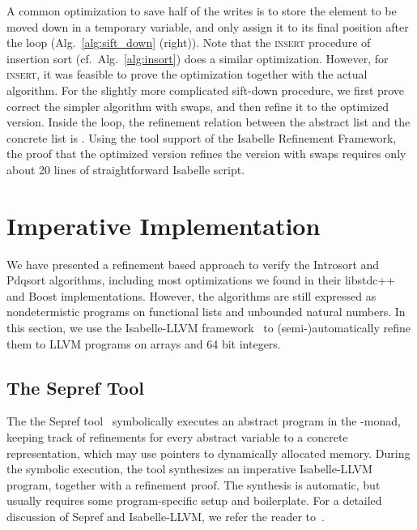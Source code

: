 \documentclass[runningheads]{llncs}
\begin{document}
  A common optimization to save half of the writes is to store the element to be moved down in a temporary variable, and only
  assign it to its final position after the loop (Alg.~\ref{alg:sift_down} (right)). Note that the \textsc{insert} procedure of insertion sort
  (cf.~Alg.~\ref{alg:insort}) does a similar optimization.
  However, for \textsc{insert}, it was feasible to prove the optimization together with the actual algorithm.
  For the slightly more complicated sift-down procedure, we first prove correct the simpler algorithm with swaps,
  and then refine it to the optimized version. Inside the loop, the refinement relation
  between the abstract list  and the concrete list  is .
  Using the tool support of the Isabelle Refinement Framework, the proof that
  the optimized version refines the version with swaps requires only about 20 lines of straightforward Isabelle script.


\section{Imperative Implementation}\label{sec:imp_impl}
  We have presented a refinement based approach to verify the Introsort and Pdqsort algorithms,
  including most optimizations we found in their libstdc++ and Boost implementations. However, the algorithms are still expressed
  as nondetermistic programs on functional lists and unbounded natural numbers.
  In this section, we use the Isabelle-LLVM framework~\cite{La19-llvm} to (semi-)automatically
  refine them to LLVM programs on arrays and 64 bit integers.

  \subsection{The Sepref Tool}
  The the Sepref tool~\cite{La15,La19-llvm} symbolically executes an abstract program in the -monad,
  keeping track of refinements for every abstract variable to a concrete representation, which may use pointers to dynamically allocated memory.
  During the symbolic execution, the tool synthesizes an imperative Isabelle-LLVM program, together with a refinement proof.
  The synthesis is automatic, but usually requires some program-specific setup and boilerplate. For a detailed discussion of Sepref and Isabelle-LLVM,
  we refer the reader to~\cite{La15,La19-llvm}.
\end{document}
